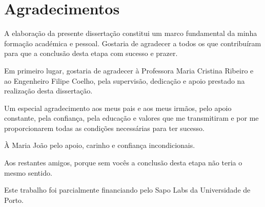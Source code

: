 \chapter*{Agradecimentos}
A elaboração da presente dissertação constitui um marco fundamental da minha formação académica e pessoal. Gostaria de agradecer a todos os que contribuíram para que a conclusão desta etapa com sucesso e prazer.

\vspace{2mm}
Em primeiro lugar, gostaria de agradecer à Professora Maria Cristina Ribeiro e ao Engenheiro Filipe Coelho, pela supervisão, dedicação e apoio prestado na realização desta dissertação.

\vspace{2mm}
Um especial agradecimento aos meus pais e aos meus irmãos, pelo apoio constante, pela confiança, pela educação e valores que me transmitiram e por me proporcionarem todas as condições necessárias para ter sucesso.

\vspace{2mm}
À Maria João pelo apoio, carinho e confiança incondicionais.

\vspace{2mm}
Aos restantes amigos, porque sem vocês a conclusão desta etapa não teria o mesmo sentido.

\vspace{10mm}
Este trabalho foi parcialmente financiando pelo Sapo Labs da Universidade de Porto.


